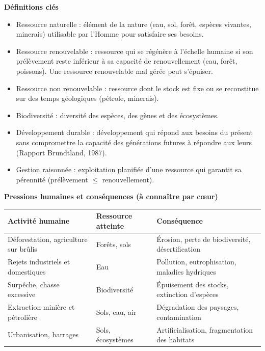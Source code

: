 \documentclass[11pt]{article}
\newcommand{\cle}[1]{{\popxbold\color{popdark}#1}}
\newcounter{popsec}
\newcounter{popsub}
\newcommand{\courssub}[1]{%
  \stepcounter{popsub}%
  \par\vspace{9pt}\noindent{\popxbold\fontsize{11.5}{13}\selectfont\color{popink}{\color{poporange}\thepopsec.\thepopsub}\hspace{6pt}#1}\par\nopagebreak\vspace{4pt}
}
\begin{document}
\courssub{L'essentiel à retenir}

\begin{bilan}
\textbf{Définitions clés}
\begin{itemize}
  \item \cle{Ressource naturelle} : élément de la nature (eau, sol, forêt, espèces vivantes, minerais) utilisable par l'Homme pour satisfaire ses besoins.
  \item \cle{Ressource renouvelable} : ressource qui se régénère à l'échelle humaine si son prélèvement reste inférieur à sa capacité de renouvellement (eau, forêt, poissons). Une ressource renouvelable mal gérée peut s'épuiser.
  \item \cle{Ressource non renouvelable} : ressource dont le stock est fixe ou se reconstitue sur des temps géologiques (pétrole, minerais).
  \item \cle{Biodiversité} : diversité des espèces, des gènes et des écosystèmes.
  \item \cle{Développement durable} : développement qui répond aux besoins du présent sans compromettre la capacité des générations futures à répondre aux leurs (Rapport Brundtland, 1987).
  \item \cle{Gestion raisonnée} : exploitation planifiée d'une ressource qui garantit sa pérennité (prélèvement $\leq$ renouvellement).
\end{itemize}

\textbf{Pressions humaines et conséquences (à connaître par c\oe ur)}
\begin{center}
\begin{tabularx}{\linewidth}{|l|X|X|}
\hline
\rowcolor{popblueL} \textbf{Activité humaine} & \textbf{Ressource atteinte} & \textbf{Conséquence} \\
\hline
Déforestation, agriculture sur brûlis & Forêts, sols & Érosion, perte de biodiversité, désertification \\
\hline
Rejets industriels et domestiques & Eau & Pollution, eutrophisation, maladies hydriques \\
\hline
Surpêche, chasse excessive & Biodiversité & Épuisement des stocks, extinction d'espèces \\
\hline
Extraction minière et pétrolière & Sols, eau, air & Dégradation des paysages, contamination \\
\hline
Urbanisation, barrages & Sols, écosystèmes & Artificialisation, fragmentation des habitats \\
\hline
\end{tabularx}
\end{center}


\end{bilan}
\end{document}
